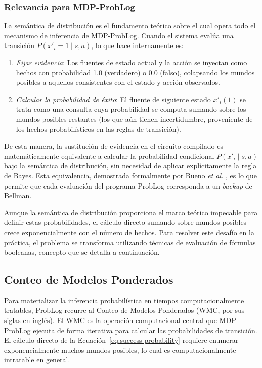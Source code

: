 \subsubsection{Relevancia para MDP-ProbLog}

La semántica de distribución es el fundamento teórico sobre el cual opera todo el mecanismo de inferencia de MDP-ProbLog. Cuando el sistema evalúa una transición $P(x'_i = 1 \mid s, a)$, lo que hace internamente es:

\begin{enumerate}
    \item \textit{Fijar evidencia}: Los fluentes de estado actual y la acción se inyectan como hechos con probabilidad 1.0 (verdadero) o 0.0 (falso), colapsando los mundos posibles a aquellos consistentes con el estado y acción observados.
    \item \textit{Calcular la probabilidad de éxito}: El fluente de siguiente estado $x'_i(1)$ se trata como una consulta cuya probabilidad se computa sumando sobre los mundos posibles restantes (los que aún tienen incertidumbre, proveniente de los hechos probabilísticos en las reglas de transición).
\end{enumerate}

De esta manera, la sustitución de evidencia en el circuito compilado es matemáticamente equivalente a calcular la probabilidad condicional $P(x'_i \mid s, a)$ bajo la semántica de distribución, sin necesidad de aplicar explícitamente la regla de Bayes. Esta equivalencia, demostrada formalmente por Bueno \textit{et al.} \cite{bueno2016mdp}, es lo que permite que cada evaluación del programa ProbLog corresponda a un \textit{backup} de Bellman.


Aunque la semántica de distribución proporciona el marco teórico impecable para definir estas probabilidades, el cálculo directo sumando sobre mundos posibles crece exponencialmente con el número de hechos. Para resolver este desafío en la práctica, el problema se transforma utilizando técnicas de evaluación de fórmulas booleanas, concepto que se detalla a continuación.

\clearpage
\subsection{Conteo de Modelos Ponderados}
\label{sec:mt-wmc}

Para materializar la inferencia probabilística en tiempos computacionalmente tratables, ProbLog recurre al Conteo de Modelos Ponderados (WMC, por sus siglas en inglés). El WMC es la operación computacional central que MDP-ProbLog ejecuta de forma iterativa para calcular las probabilidades de transición. El cálculo directo de la Ecuación~\ref{eq:success-probability} requiere enumerar exponencialmente muchos mundos posibles, lo cual es computacionalmente intratable en general.

